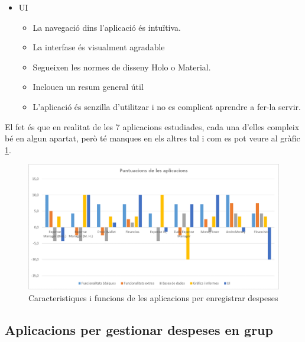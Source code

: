 \begin{itemize}
\item \ac{UI}
\begin{itemize}
\item La navegació dins l'aplicació és intuïtiva. 
\item La interfase és visualment agradable
\item Segueixen les normes de disseny \gls{Holo} o \gls{Material}. 
\item Inclouen un resum general útil
\item L'aplicació és senzilla d'utilitzar i no es complicat aprendre a fer-la servir.
\end{itemize}
\end{itemize}

El fet és que en realitat de les 7 aplicacions estudiades, cada una d'elles compleix bé en algun apartat, però té manques en els altres tal i com es pot veure al gràfic \ref{fig:taula_resum_apps}.

\begin{figure}[htp]
\centering
\includegraphics[scale=0.5]{grafic_apps.png}
\caption{Caracteristiques i funcions de les aplicacions per enregistrar despeses}\label{fig:taula_resum_apps}
\end{figure}

\subsection{Aplicacions per gestionar despeses en grup}

